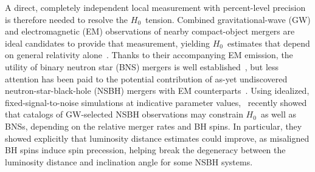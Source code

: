 \documentclass[%
 reprint,
 superscriptaddress,
 nofootinbib,
 amsmath,amssymb,
 aps,
]{revtex4-2}
\newcommand{\hubble}{\ensuremath{H_0}}
\begin{document}
A direct, completely independent local measurement with percent-level precision is therefore needed to resolve the \hubble\ tension. Combined gravitational-wave (GW) and electromagnetic (EM) observations of nearby compact-object mergers are ideal candidates to provide that measurement, yielding \hubble\ estimates that depend on general relativity alone~\cite{Schutz:1986,Holz_Hughes:2005,Dalal:2006,Nissanke_etal:2010,Taylor_etal:2012,Messenger_Read:2012,Nissanke_etal:2013,Oguri:2016,delPozzo:2017,Abbott_etal:2017a,Seto:2018,Chen_etal:2018,Fishbach_etal:2018,Feeney_etal:2018,Mortlock_etal:2019,Soares-Santos_etal:2019,Gray_etal:2019,Palmese_etal:2020,Vasylyev_Filippenko:2020,Chen_etal:2020,Gayathri_etal:2020,Mukherjee_etal:2020}. Thanks to their accompanying EM emission, the utility of binary neutron star (BNS) mergers is well established~\cite{Dalal:2006,Nissanke_etal:2010,Taylor_etal:2012,Messenger_Read:2012,Nissanke_etal:2013,Oguri:2016,delPozzo:2017,Abbott_etal:2017a,Seto:2018,Chen_etal:2018,Fishbach_etal:2018,Feeney_etal:2018,Mortlock_etal:2019,Gray_etal:2019}, 
but less attention has been paid to the potential contribution of as-yet undiscovered neutron-star-black-hole (NSBH) mergers with EM counterparts~\cite{Nissanke_etal:2010,Nissanke_etal:2013,Vitale_Chen:2018}. Using idealized, fixed-signal-to-noise simulations at indicative parameter values,~\citet{Vitale_Chen:2018} recently showed that catalogs of GW-selected NSBH observations may constrain \hubble\ as well as BNSs, depending on the relative merger rates and BH spins. In particular, they showed explicitly that luminosity distance estimates could improve, as misaligned BH spins induce spin precession, helping break the degeneracy between the luminosity distance and inclination angle for some NSBH systems.

\end{document}
